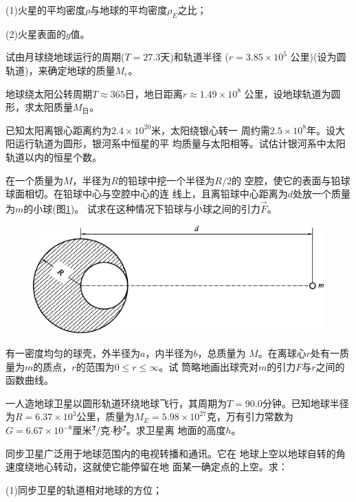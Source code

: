 \begin{exercises}
(1)火星的平均密度$\rho$与地球的平均密度$ \rho _ E $之比；

(2)火星表面的$ g $值。

\exercise 试由月球绕地球运行的周期($ T = 2 7 . 3 $天)和轨道半径
($ r = 3 . 8 5 \times 1 0 ^ { 5 } $ 公里)(设为圆轨道)，来确定地球的质量$ M _ e $。

\exercise 地球绕太阳公转周期$ T \approx 3 6 5 $日，地日距离$ r \approx 1 . 4 9 \times 1 0 ^ { 8 } $
公里，设地球轨道为圆形，求太阳质量$ M _ \text{日} $。

\exercise 已知太阳离银心距离约为$ 2 . 4 \times 1 0 ^ { 2 0 } $米，太阳绕银心转一
周约需$ 2 . 5 \times 1 0 ^ { 8 } $年。设大阳运行轨道为圆形，银河系中恒星的平
均质量与太阳相等。试估计银河系中太阳轨道以内的恒星个数。

\exercise 在一个质量为$ M $，半径为$ R $的铅球中挖一个半径为$ R/2 $的
空腔，使它的表面与铅球球面相切。在铅球中心与空腔中心的连
线上，且离铅球中心距离为$ d $处放一个质量为$ m $的小球(图\ref{fig:04.12})。
试求在这种情况下铅球与小球之间的引力$ \vec{F} $。
\begin{figure}[h]
  \centering
  \includegraphics{figure/fig04.12}
  \caption{}
  \label{fig:04.12}
\end{figure}

\exercise 有一密度均匀的球壳，外半径为$ a $，内半径为$ b $，总质量为
$ M $。在离球心$ r $处有一质量为$ m $的质点，$ r $的范围为$ 0 \leqslant r \leqslant \infty $。试
筒略地画出球壳对$ m $的引力$ F $与$ r $之间的函数曲线。

\exercise 一人造地球卫星以圆形轨道环绕地球飞行，其周期为$ T =
  90.0 $分钟。已知地球半径为$ R = 6. 3 7 \times 1 0 ^ { 3 } $公里，质量为$ M _ { E } = 5 . 9 8
  \times 1 0 ^ { 2 7 } $克，万有引力常数为$ G = 6 . 6 7 \times 1 0 ^ { - 8 } $厘米\.$ ^3 $/克$ \cdot $秒\.$ ^2 $。求卫星离
地面的高度$ h $。

\exercise 同步卫星广泛用于地球范围内的电视转播和通讯。它在
地球上空以地球自转的角速度绕地心转动，这就使它能停留在地
面某一确定点的上空。求：

(1)同步卫星的轨道相对地球的方位；


\end{exercises}
